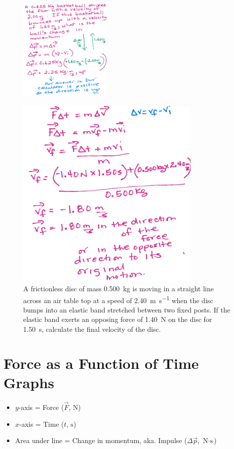 \documentclass[a4paper,12pt]{article}
\begin{document}
\begin{figure}[H]
    \centering
    \includegraphics[width=0.4\textwidth]{q-imp}
\end{figure}
\begin{figure}[H]
    \centering
    \caption{A frictionless disc of mass \SI{0.500}{\kg} is moving in a straight line across an air table top at a speed of \SI{2.40}{\m\per\s} when the disc bumps into an elastic band stretched between two fixed posts. If the elastic band exerts an opposing force of \SI{1.40}{\N} on the disc for \SI{1.50}{\s}, calculate the final velocity of the disc.}
    \includegraphics[width=0.8\textwidth]{q-imp-2}
\end{figure}

\pagebreak

\section{Force as a Function of Time Graphs}
\begin{itemize}
    \item{$y$-axis = Force ($\vec{F}$, $\si{\N}$)}
    \item{$x$-axis = Time ($t$, $\si{\s}$)}
    \item{Area under line = Change in momentum, aka. Impulse ($\Delta{\vec{p}}$, $\si{\N\cdot\s}$)}
\end{itemize}
\end{document}
